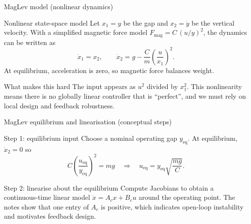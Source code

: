 \documentclass[aspectratio=169,11pt]{beamer}
\begin{document}
\begin{frame}{MagLev model (nonlinear dynamics)}
\begin{block}{Nonlinear state-space model}
Let $x_1=y$ be the gap and $x_2=\dot{y}$ be the vertical velocity. With a simplified magnetic force model $F_{\mathrm{mag}} = C\,(u/y)^2$, the dynamics can be written as
\[
\dot{x}_1 = x_2,\qquad
\dot{x}_2 = g - \frac{C}{m}\left(\frac{u}{x_1}\right)^2.
\]
At equilibrium, acceleration is zero, so magnetic force balances weight.
\end{block}

\begin{alertblock}{What makes this hard}
The input appears as $u^2$ divided by $x_1^2$. This nonlinearity means there is no globally linear controller that is ``perfect'', and we must rely on local design and feedback robustness.
\end{alertblock}
\end{frame}

\begin{frame}{MagLev equilibrium and linearisation (conceptual steps)}
\begin{block}{Step 1: equilibrium input}
Choose a nominal operating gap $y_{\mathrm{eq}}$. At equilibrium, $\dot{x}_2=0$ so
\[
C\left(\frac{u_{\mathrm{eq}}}{y_{\mathrm{eq}}}\right)^2 = mg
\quad\Rightarrow\quad
u_{\mathrm{eq}} = y_{\mathrm{eq}}\sqrt{\frac{mg}{C}}.
\]
\end{block}

\begin{block}{Step 2: linearise about the equilibrium}
Compute Jacobians to obtain a continuous-time linear model $\dot{x}=A_c x + B_c u$ around the operating point. The notes show that one entry of $A_c$ is positive, which indicates open-loop instability and motivates feedback design.
\end{block}
\end{frame}
\end{document}
